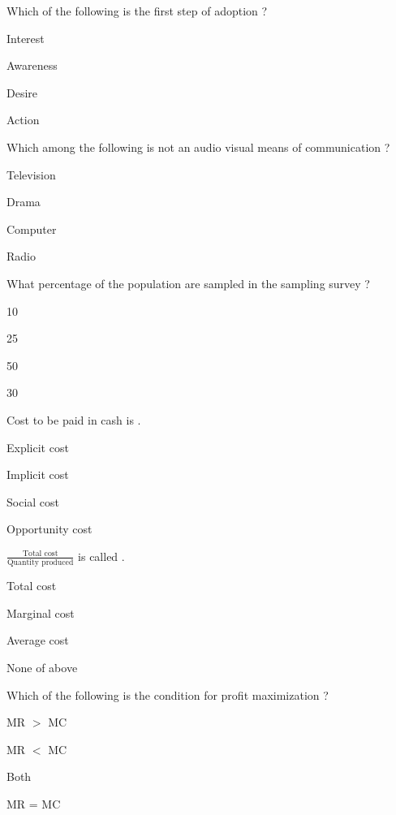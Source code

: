 \begin{questions}
\question Which of the following is the first step of adoption ?
\begin{items}
\item Interest
\item* Awareness
\item Desire
\item Action
\end{items}

\question Which among the following is not an audio visual means of communication ?
\begin{items}
\item Television
\item Drama
\item Computer
\item* Radio
\end{items}

\question What percentage of the population are sampled in the sampling survey ?
\begin{items}
\item* 10
\item 25
\item 50
\item 30
\end{items}

\question Cost to be paid in cash is \fillin[][3cm].
\begin{items}
\item* Explicit cost
\item Implicit cost
\item Social cost
\item Opportunity cost
\end{items}

\question $\frac{\text{Total cost}}{\text{Quantity produced}}$ is called \fillin[][3cm].
\begin{items}
\item Total cost
\item Marginal cost
\item* Average cost
\item None of above
\end{items}

\question Which of the following is the condition for profit maximization ?
\begin{items}
\item MR $>$ MC
\item MR $<$ MC
\item Both
\item* MR = MC
\end{items}


\end{questions}
